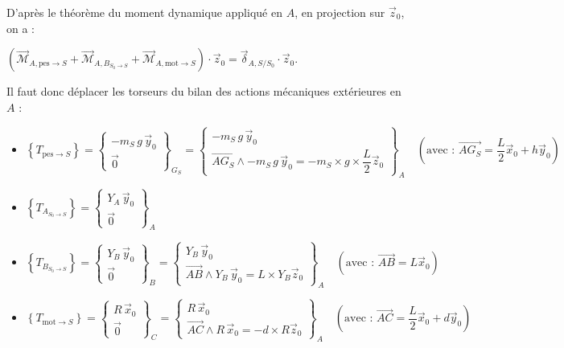 \ifprof
\begin{corrige}
D'après le théorème du moment dynamique appliqué en $A$, en projection sur $\vec z_0$, on a :

$\left( \overrightarrow{\mathcal{M}}_{A, \text{pes} \to S} +  \overrightarrow{\mathcal{M}}_{A, B_{S_0\to S}} + \overrightarrow{\mathcal{M}}_{A, \text{mot} \to S} \right) \cdot \vec z_0 = \overrightarrow{\delta}_{A, S/S_0} \cdot \vec z_0 $.

Il faut donc déplacer les torseurs du bilan des actions mécaniques extérieures en $A$ :

\begin{itemize}
\item $\left\{  T_{\text{pes}\to S} \right\} = \begin{Bmatrix} - m_S \, g \, \vec y_0 \\ \overrightarrow{0} \end{Bmatrix}_{G_S} = \begin{Bmatrix} - m_S \, g \, \vec y_0 \\ \overrightarrow{AG_S} \wedge - m_S \, g \, \vec y_0  = - m_S \times g \times \dfrac{L}{2} \vec z_0 \end{Bmatrix}_{A}  \quad \left(\text{avec : } \overrightarrow{AG_S} = \dfrac{L}{2} \vec x_0 + h \vec y_0 \right)$
\item $\left\{  T_{A_{S_0\to S}}\right\} = \begin{Bmatrix} Y_A \, \vec y_0 \\ \overrightarrow{0} \end{Bmatrix}_A $
\item $\left\{  T_{B_{S_0\to S}}\right\} = \begin{Bmatrix} Y_B \, \vec y_0 \\ \overrightarrow{0} \end{Bmatrix}_B = \begin{Bmatrix} Y_B \, \vec y_0 \\ \overrightarrow{AB} \wedge Y_B \, \vec y_0 = L \times Y_B \vec z_0 \end{Bmatrix}_A \quad \left(\text{avec : } \overrightarrow{AB} = L \vec x_0 \right)$
\item $\left\{ T_{\text{mot}\to S} \right\} = \begin{Bmatrix} R \, \vec x_0 \\ \overrightarrow{0} \end{Bmatrix}_C = \begin{Bmatrix} R \, \vec x_0 \\ \overrightarrow{AC} \wedge R \, \vec x_0 = - d \times R \vec z_0 \end{Bmatrix}_A \quad \left(\text{avec : } \overrightarrow{AC} = \dfrac{L}{2} \vec x_0 + d \vec y_0 \right)$
\end{itemize}


\end{corrige}
